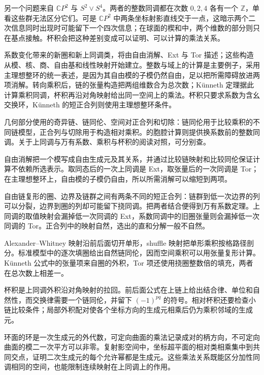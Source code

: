 另一个问题来自 \(\mathbb CP^2\) 与 \(S^2\vee S^4\)。两者的整数同调都在次数 \(0,2,4\) 各有一个 \(\mathbb Z\)，单看这些群无法区分它们。可是 \(\mathbb CP^2\) 中两条坐标射影直线交于一点，这暗示两个二次信息同时出现时可能留下一个四次信息；在球面的楔和中，两个维数的部分则只在基点接触。杯积会把这种差别变成可以证明、可以计算的乘法关系。

\ProseParagraphBreak

系数变化带来的新圈和新上同调类，将由自由消解、Ext 与 Tor 描述；这些构造从模、核、商、自由基和线性映射开始建立。整数与域上的计算是主要例子，采用主理想整环的统一表述，是因为其自由模的子模仍然自由，足以把所需障碍放进两项消解。转向乘积后，链的张量构造把两组维数合为总次数；Künneth 定理据此计算乘积同调，杯积再沿对角映射给出同一空间上的乘法。杯积只要求系数为含幺交换环，Künneth 的短正合列则使用主理想整环条件。

\ProseParagraphBreak

几何部分使用的奇异链、链同伦、空间对正合列和切除：链同伦用于比较乘积的不同链模型，正合列与切除用于构造相对乘积。的胞腔计算则提供换系数前的整数同调。关于上同调与万有系数、乘积与杯积的阅读对照，可分别查\cite[第3.1节、第3.A节；第3.2节、第3.B节]{Hatcher2002}。







\begin{chaptersummary}
	自由消解把一个模写成自由生成元及其关系，并通过比较链映射和比较同伦保证计算不依赖所选表示。取同态后的一次上同调是 Ext，取张量后的一次同调是 Tor；在主理想整环上，自由模的子模仍自由，所以所需消解可以缩短到两项。

	\ProseParagraphBreak

	自由链复形的圈、边界及链群之间有两条不同的短正合列：链群到低一次边界的列可以分裂，边界到圈的列却可能留下挠同调。把两者结合便得到万有系数定理。上同调的取值映射会漏掉低一次同调的 Ext，系数同调中的旧圈张量则会漏掉低一次同调的 Tor。正合列中的映射自然，选出的直和分解一般不自然。

	\ProseParagraphBreak

	Alexander--Whitney 映射沿前后面切开单形，shuffle 映射把单形乘积按格路径剖分。标准模型中的逐次填圈给出自然链同伦，因而空间乘积可以用张量复形计算。Künneth 公式中的张量项来自圈的外积，Tor 项还使用挠圈整数倍的填充，两者在总次数上相差一。

	\ProseParagraphBreak

	杯积是上同调外积沿对角映射的拉回。前后面公式在上链上给出结合律、单位和自然性，而交换律需要一个链同伦，并留下 \((-1)^{pq}\) 的符号。相对杯积还要检查小链比较条件；局部外积配对使各个坐标方向的生成元相乘后仍为乘积邻域的生成元。

	\ProseParagraphBreak

	环面的环是一次生成元的外代数，可定向曲面的乘法记录成对的柄方向，不可定向曲面的模二一次平方可以非零。复射影空间中，坐标超平面的相对类相乘集中到共同交点，证明二次生成元的每个允许幂都是生成元。这些乘法关系既能区分加性同调相同的空间，也能限制连续映射在上同调上的作用。
\end{chaptersummary}

